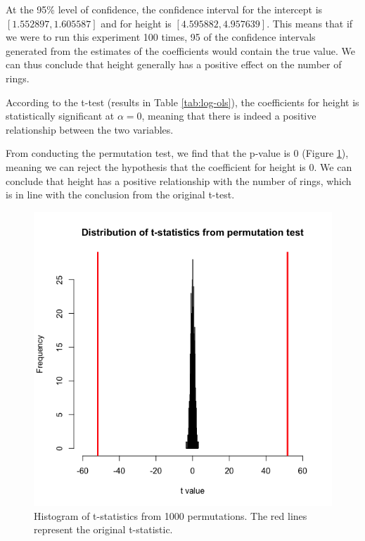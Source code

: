 \documentclass[11pt,letterpaper]{article}
\begin{document}
  At the 95\% level of confidence, the confidence interval for the intercept is $[1.552897, 1.605587]$ and for height is $[4.595882, 4.957639]$. This means that if we were to run this experiment 100 times, 95 of the confidence intervals generated from the estimates of the coefficients would contain the true value. We can thus conclude that height generally has a positive effect on the number of rings.
  
  According to the t-test (results in Table \ref{tab:log-ols}), the coefficients for height is statistically significant at $\alpha=0$, meaning that there is indeed a positive relationship between the two variables. 
  
  From conducting the permutation test, we find that the p-value is 0 (Figure \ref{fig:permute}), meaning we can reject the hypothesis that the coefficient for height is 0. We can conclude that height has a positive relationship with the number of rings, which is in line with the conclusion from the original t-test.
  
	\begin{figure}[h]
	  	\centering
	  	\includegraphics[height=0.4\textheight]{2-permutation}
	  	\caption{Histogram of t-statistics from 1000 permutations. The red lines represent the original t-statistic.}
	  	\label{fig:permute}
  	\end{figure}
  
\end{document}
